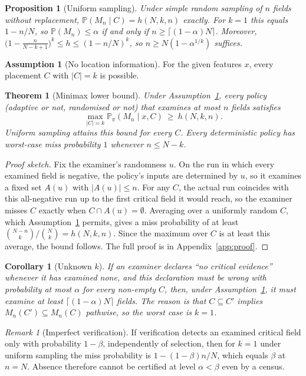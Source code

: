 \documentclass[11pt]{article}
\newtheorem{proposition}{Proposition}
\newtheorem{theorem}{Theorem}
\newtheorem{corollary}{Corollary}
\theoremstyle{remark}
\newtheorem{remark}{Remark}
\theoremstyle{definition}
\newtheorem{assumption}{Assumption}
\newcommand{\Prb}{\mathbb{P}}
\begin{document}
\begin{proposition}[Uniform sampling]\label{prop:uniform}
Under simple random sampling of $n$ fields without replacement, $\Prb(M_n\mid C)=h(N,k,n)$ exactly. For $k=1$ this equals $1-n/N$, so $\Prb(M_n)\le\alpha$ if and only if $n\ge\lceil(1-\alpha)N\rceil$. Moreover, $\big(1-\tfrac{n}{N-k+1}\big)^k\le h\le(1-n/N)^k$, so $n\ge N(1-\alpha^{1/k})$ suffices.
\end{proposition}

\begin{assumption}[No location information]\label{ass:A}
For the given features $x$, every placement $C$ with $|C|=k$ is possible.
\end{assumption}

\begin{theorem}[Minimax lower bound]\label{thm:minimax}
Under Assumption~\ref{ass:A}, every policy (adaptive or not, randomised or not) that examines at most $n$ fields satisfies
\[
\max_{|C|=k}\Prb_\pi(M_n\mid x,C)\ \ge\ h(N,k,n).
\]
Uniform sampling attains this bound for every $C$. Every deterministic policy has worst-case miss probability $1$ whenever $n\le N-k$.
\end{theorem}
\begin{proof}[Proof sketch]
Fix the examiner's randomness $u$. On the run in which every examined field is negative, the policy's inputs are determined by $u$, so it examines a fixed set $A(u)$ with $|A(u)|\le n$. For any $C$, the actual run coincides with this all-negative run up to the first critical field it would reach, so the examiner misses $C$ exactly when $C\cap A(u)=\emptyset$. Averaging over a uniformly random $C$, which Assumption~\ref{ass:A} permits, gives a miss probability of at least $\binom{N-n}{k}/\binom{N}{k}=h(N,k,n)$. Since the maximum over $C$ is at least this average, the bound follows. The full proof is in Appendix~\ref{app:proof}.
\end{proof}

\begin{corollary}[Unknown $k$]\label{cor:unknown}
If an examiner declares ``no critical evidence'' whenever it has examined none, and this declaration must be wrong with probability at most $\alpha$ for every non-empty $C$, then, under Assumption~\ref{ass:A}, it must examine at least $\lceil(1-\alpha)N\rceil$ fields. The reason is that $C\subseteq C'$ implies $M_n(C')\subseteq M_n(C)$ pathwise, so the worst case is $k=1$.
\end{corollary}

\begin{remark}[Imperfect verification]
If verification detects an examined critical field only with probability $1-\beta$, independently of selection, then for $k=1$ under uniform sampling the miss probability is $1-(1-\beta)n/N$, which equals $\beta$ at $n=N$. Absence therefore cannot be certified at level $\alpha<\beta$ even by a census.
\end{remark}
\end{document}
